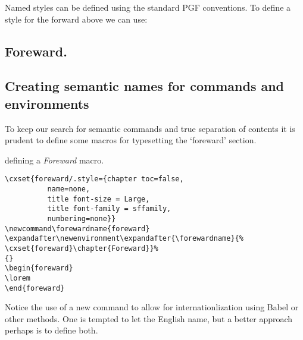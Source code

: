 Named styles can be defined using the standard \textsc{PGF} conventions. To define a style for the forward above we can use:

\begin{texexample}{}{}
\chapter{Foreward.}
\lorem
\end{texexample}



\section{Creating semantic names for commands and environments}

To keep our search for semantic commands and true separation of contents it is prudent to define some macros for typesetting the  `foreward' section.

\bgroup
\begin{texexample}{defining a \textit{Foreward} macro.}{}
\begin{lstlisting}
\cxset{foreward/.style={chapter toc=false,
          name=none,
          title font-size = Large,
          title font-family = sffamily,
          numbering=none}}
\newcommand\forewardname{foreward}
\expandafter\newenvironment\expandafter{\forewardname}{%
\cxset{foreward}\chapter{Foreward}}%
{}
\begin{foreward}
\lorem
\end{foreward}
\end{lstlisting}
\end{texexample}
\egroup

Notice the use of a new command \cmd{\forewardname} to allow for internationlization using Babel or other methods. One is tempted to let the English name, but a better approach perhaps is to define both.

\makeatletter


